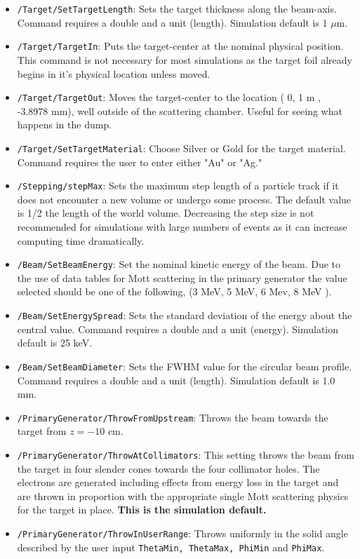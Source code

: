 \documentclass[11pt]{article}
\begin{document}
\begin{itemize}
 \item \texttt{/Target/SetTargetLength}: Sets the target thickness along the beam-axis. Command requires a double and a unit (length). Simulation default is 1 $\mu$m.
 \item \texttt{/Target/TargetIn}: Puts the target-center at the nominal physical position. This command is not necessary for most simulations as the target foil already begins in it's physical location unless moved.
 \item \texttt{/Target/TargetOut}: Moves the target-center to the location ( 0, 1 m , -3.8978 mm), well outside of the scattering chamber. Useful for seeing what happens in the dump. 
 \item \texttt{/Target/SetTargetMaterial}: Choose Silver or Gold for the target material. Command requires the user to enter either "Au" or "Ag."
 \item \texttt{/Stepping/stepMax}: Sets the maximum step length of a particle track if it does not encounter a new volume or undergo some process. The default value is 1/2 the length of the world volume. Decreasing the step size is not recommended for simulations with large numbers of events as it can increase computing time dramatically. 
 \item \texttt{/Beam/SetBeamEnergy}: Set the nominal kinetic energy of the beam. Due to the use of data tables for Mott scattering in the primary generator the value selected should be one of the following, (3 MeV, 5 MeV, 6 Mev, 8 MeV ).
 \item \texttt{/Beam/SetEnergySpread}: Sets the standard deviation of the energy about the central value. Command requires a double and a unit (energy). Simulation default is 25 keV. 
 \item \texttt{/Beam/SetBeamDiameter}: Sets the FWHM value for the circular beam profile. Command requires a double and a unit (length). Simulation default is 1.0 mm. 
 \item \texttt{/PrimaryGenerator/ThrowFromUpstream}: Throws the beam towards the target from $z = -10$ cm.
 \item \texttt{/PrimaryGenerator/ThrowAtCollimators}: This setting throws the beam from the target in four slender cones towards the four collimator holes. The electrons are generated including effects from energy loss in the target and are thrown in proportion with the appropriate single Mott scattering physics for the target in place. \textbf{This is the simulation default.}
 \item \texttt{/PrimaryGenerator/ThrowInUserRange}: Throws uniformly in the solid angle described by the user input \texttt{ThetaMin, ThetaMax, PhiMin} and \texttt{PhiMax}.

\end{itemize}
\end{document}
